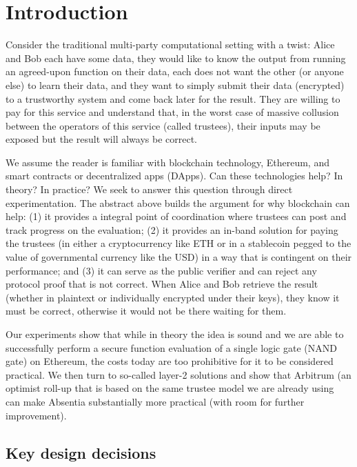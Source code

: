 
\section{Introduction}

Consider the traditional multi-party computational setting with a twist: Alice and Bob each have some data, they would like to know the output from running an agreed-upon function on their data, each does not want the other (or anyone else) to learn their data, and they want to simply submit their data (\eg encrypted) to a trustworthy system and come back later for the result. They are willing to pay for this service and understand that, in the worst case of massive collusion between the operators of this service (called trustees), their inputs may be exposed but the result will always be correct.

We assume the reader is familiar with blockchain technology, Ethereum, and smart contracts or decentralized apps (DApps). Can these technologies help? In theory? In practice? We seek to answer this question through direct experimentation. The abstract above builds the argument for why blockchain can help: (1) it provides a integral point of coordination where trustees can post and track progress on the evaluation; (2) it provides an in-band solution for paying the trustees (in either a cryptocurrency like ETH or in a stablecoin pegged to the value of governmental currency like the USD) in a way that is contingent on their performance; and (3) it can serve as the public verifier and can reject any protocol proof that is not correct. When Alice and Bob retrieve the result (whether in plaintext or individually encrypted under their keys), they know it must be correct, otherwise it would not be there waiting for them.

Our experiments show that while in theory the idea is sound and we are able to successfully perform a secure function evaluation of a single logic gate (NAND gate) on Ethereum, the costs today are too prohibitive for it to be considered practical. We then turn to so-called layer-2 solutions and show that Arbitrum (an optimist roll-up that is based on the same trustee model we are already using~\cite{KGCWF18} can make Absentia substantially more practical (with room for further improvement).
 
\subsection{Key design decisions}

